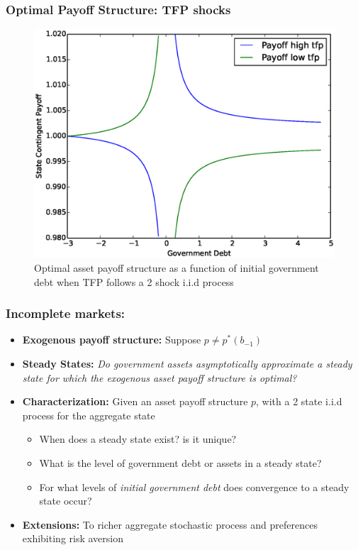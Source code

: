 \documentclass{beamer}
\begin{document}
  \begin{frame}
   \frametitle{Optimal Payoff Structure: TFP shocks}
	\begin{figure}
		\begin{center}
		\includegraphics[scale=.4]{Images/p_graph_tfp.eps}
		\caption{Optimal asset payoff structure as a function of initial government debt when TFP follows a 2 shock i.i.d process}
	\end{center}	
	\end{figure}

  \end{frame}


\begin{frame}
	\frametitle{Incomplete markets:}
	\begin{itemize}
		\item  \textbf{Exogenous payoff structure:} Suppose $p\neq p^*(b_{-1})$
		\item \textbf{Steady States: }\emph{Do government assets asymptotically approximate a  steady
		state for which  the exogenous asset payoff structure is optimal?}
		
		\item \textbf{Characterization: } Given an asset payoff structure $p$, with  a 2 state i.i.d process for the aggregate state
		\begin{itemize}
			\item When does a steady state exist? is it unique?
			\item What is the level of government debt or   assets in a steady state?
			\item For what levels of  \emph{initial government debt} does  convergence to a steady state occur?
 			\end{itemize}
		\item  \textbf{Extensions: } To richer  aggregate stochastic  process and  preferences exhibiting risk aversion
	\end{itemize}
\end{frame}
\end{document}
